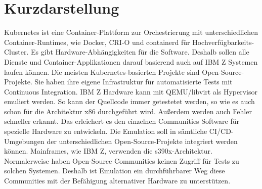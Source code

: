 \thispagestyle{empty}
\section*{Kurzdarstellung}
\label{sec:kurzdarstellung}
Kubernetes ist eine Container-Plattform zur Orchestrierung mit unterschiedlichen Container-Runtimes, wie Docker, CRI-O und containerd für Hochverfügbarkeits-Cluster. Es gibt Hardware-Abhängigkeiten für die Software. Deshalb sollen alle Dienste und Container-Applikationen darauf basierend auch auf IBM Z Systemen laufen können. Die meisten Kubernetes-basierten Projekte sind Open-Source-Projekte. Sie haben ihre eigene Infrastruktur für automatisierte Tests mit Continuous Integration. IBM Z Hardware kann mit QEMU/libvirt als Hypervisor emuliert werden. So kann der Quellcode immer getestetet werden, so wie es auch schon für die Architektur x86 durchgeführt wird. Außerdem werden auch Fehler schneller erkannt. Das erleichert es den einzelnen Communities Software für spezielle Hardware zu entwickeln. Die Emulation soll in sämtliche CI/CD-Umgebungen der unterschiedlichen Open-Source-Projekte integriert werden können. Mainframes, wie IBM Z, verwenden die s390x-Architektur. Normalerweise haben Open-Source Communities keinen Zugriff für Tests zu solchen Systemen. Deshalb ist Emulation ein durchführbarer Weg diese Communities mit der Befähigung alternativer Hardware zu unterstützen.



